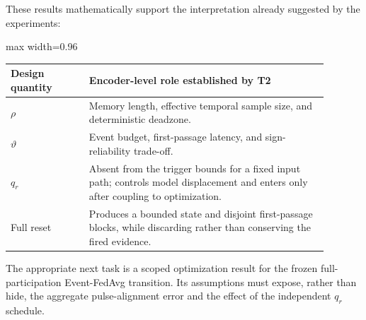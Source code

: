 These results mathematically support the interpretation already suggested by the experiments:
\begin{center}
\begin{adjustbox}{max width=0.96\linewidth}
\begin{tabular}{p{0.22\linewidth}p{0.67\linewidth}}
\toprule
Design quantity & Encoder-level role established by T2\\
\midrule
$\rho$ & Memory length, effective temporal sample size, and deterministic deadzone.\\
$\vartheta$ & Event budget, first-passage latency, and sign-reliability trade-off.\\
$q_r$ & Absent from the trigger bounds for a fixed input path; controls model displacement and enters only after coupling to optimization.\\
Full reset & Produces a bounded state and disjoint first-passage blocks, while discarding rather than conserving the fired evidence.\\
\bottomrule
\end{tabular}
\end{adjustbox}
\end{center}

The appropriate next task is a scoped optimization result for the frozen full-participation Event-FedAvg transition. Its assumptions must expose, rather than hide, the aggregate pulse-alignment error and the effect of the independent $q_r$ schedule.
